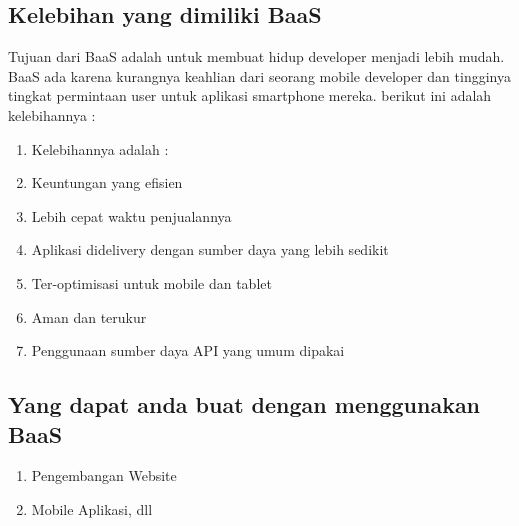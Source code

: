 \subsection{Kelebihan yang dimiliki BaaS}
Tujuan dari BaaS adalah untuk membuat hidup developer menjadi 
lebih mudah. BaaS ada karena kurangnya keahlian dari seorang 
mobile developer dan tingginya tingkat permintaan user untuk 
aplikasi smartphone mereka. berikut ini adalah kelebihannya :

\begin{enumerate}
\item Kelebihannya adalah :
\item Keuntungan yang efisien
\item Lebih cepat waktu penjualannya
\item Aplikasi didelivery dengan sumber daya yang lebih sedikit
\item Ter-optimisasi untuk mobile dan tablet
\item Aman dan terukur
\item Penggunaan sumber daya API yang umum dipakai
\end{enumerate}

\subsection {Yang dapat anda buat dengan menggunakan BaaS}
\begin{enumerate}
\item Pengembangan Website
\item Mobile Aplikasi, dll
\end{enumerate}







		

